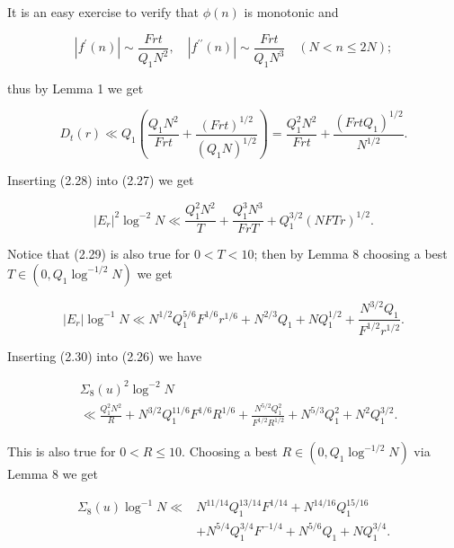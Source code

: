 \documentclass[10pt]{article}
\begin{document}
It is an easy exercise to verify that $\phi(n)$ is monotonic and

$$
\left|f^{\prime}(n)\right| \sim \frac{F r t}{Q_{1} N^{2}}, \quad\left|f^{\prime \prime}(n)\right| \sim \frac{F r t}{Q_{1} N^{3}} \quad(N<n \leq 2 N) ;
$$

thus by Lemma 1 we get


\begin{equation*}
D_{t}(r) \ll Q_{1}\left(\frac{Q_{1} N^{2}}{F r t}+\frac{(F r t)^{1 / 2}}{\left(Q_{1} N\right)^{1 / 2}}\right)=\frac{Q_{1}^{2} N^{2}}{F r t}+\frac{\left(F r t Q_{1}\right)^{1 / 2}}{N^{1 / 2}} . \tag{2.28}
\end{equation*}


Inserting (2.28) into (2.27) we get


\begin{equation*}
\left|E_{r}\right|^{2} \log ^{-2} N \ll \frac{Q_{1}^{2} N^{2}}{T}+\frac{Q_{1}^{3} N^{3}}{F r T}+Q_{1}^{3 / 2}(N F T r)^{1 / 2} . \tag{2.29}
\end{equation*}


Notice that (2.29) is also true for $0<T<10$; then by Lemma 8 choosing a best $T \in\left(0, Q_{1} \log ^{-1 / 2} N\right)$ we get


\begin{equation*}
\left|E_{r}\right| \log ^{-1} N \ll N^{1 / 2} Q_{1}^{5 / 6} F^{1 / 6} r^{1 / 6}+N^{2 / 3} Q_{1}+N Q_{1}^{1 / 2}+\frac{N^{3 / 2} Q_{1}}{F^{1 / 2} r^{1 / 2}} . \tag{2.30}
\end{equation*}


Inserting (2.30) into (2.26) we have


\begin{align*}
& \Sigma_{8}(u)^{2} \log ^{-2} N  \tag{2.31}\\
& \ll \frac{Q_{1}^{2} N^{2}}{R}+N^{3 / 2} Q_{1}^{11 / 6} F^{1 / 6} R^{1 / 6}+\frac{N^{5 / 2} Q_{1}^{2}}{F^{1 / 2} R^{1 / 2}}+N^{5 / 3} Q_{1}^{2}+N^{2} Q_{1}^{3 / 2}.
\end{align*}


This is also true for $0<R \leq 10$. Choosing a best $R \in\left(0, Q_{1} \log ^{-1 / 2} N\right)$ via Lemma 8 we get


\begin{align*}
\Sigma_{8}(u) \log ^{-1} N \ll & N^{11 / 14} Q_{1}^{13 / 14} F^{1 / 14}+N^{14 / 16} Q_{1}^{15 / 16}  \tag{2.32}\\
& +N^{5 / 4} Q_{1}^{3 / 4} F^{-1 / 4}+N^{5 / 6} Q_{1}+N Q_{1}^{3 / 4}.
\end{align*}
\end{document}

